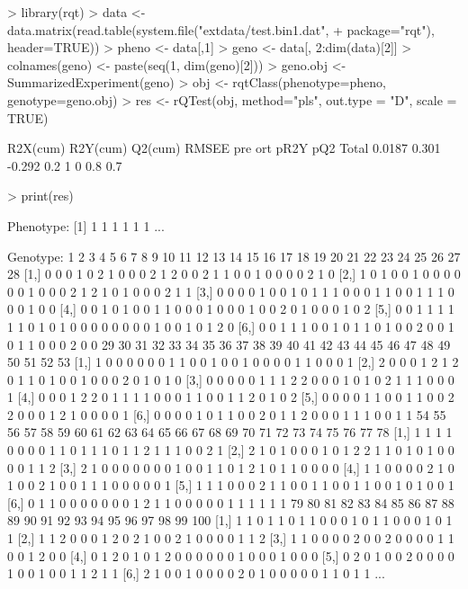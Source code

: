 \documentclass{article}
\begin{document}
\begin{Schunk}
\begin{Sinput}
> library(rqt)
> data <- data.matrix(read.table(system.file("extdata/test.bin1.dat",
+                                            package="rqt"), header=TRUE))
> pheno <- data[,1]
> geno <- data[, 2:dim(data)[2]]
> colnames(geno) <- paste(seq(1, dim(geno)[2]))
> geno.obj <- SummarizedExperiment(geno)
> obj <- rqtClass(phenotype=pheno, genotype=geno.obj)
> res <- rQTest(obj, method="pls", out.type = "D", scale = TRUE)
\end{Sinput}
\begin{Soutput}
      R2X(cum) R2Y(cum) Q2(cum) RMSEE pre ort pR2Y pQ2
Total   0.0187    0.301  -0.292   0.2   1   0  0.8 0.7
\end{Soutput}
\begin{Sinput}
> print(res)
\end{Sinput}
\begin{Soutput}
Phenotype:
[1] 1 1 1 1 1 1
...

Genotype:
     1 2 3 4 5 6 7 8 9 10 11 12 13 14 15 16 17 18 19 20 21 22 23 24 25 26 27 28
[1,] 0 0 0 1 0 2 1 0 0  0  2  1  2  0  0  2  1  1  0  0  1  0  0  0  0  2  1  0
[2,] 1 0 1 0 0 1 0 0 0  0  0  0  1  0  0  0  2  1  2  1  0  1  0  0  0  2  1  1
[3,] 0 0 0 0 1 0 0 1 0  1  1  1  0  0  0  1  1  0  0  1  1  1  0  0  0  1  0  0
[4,] 0 0 1 0 1 0 0 1 1  0  0  0  1  0  0  0  1  0  0  2  0  1  0  0  0  1  0  2
[5,] 0 0 1 1 1 1 1 1 0  1  0  1  0  0  0  0  0  0  0  0  1  0  0  1  0  1  2  0
[6,] 0 0 1 1 1 0 0 1 0  1  1  0  1  0  0  2  0  0  1  0  1  1  0  0  0  2  0  0
     29 30 31 32 33 34 35 36 37 38 39 40 41 42 43 44 45 46 47 48 49 50 51 52 53
[1,]  1  0  0  0  0  0  0  1  1  0  0  1  0  0  1  0  0  0  0  1  1  0  0  0  1
[2,]  2  0  0  0  1  2  1  2  0  1  1  0  1  0  0  1  0  0  0  2  0  1  0  1  0
[3,]  0  0  0  0  0  1  1  1  2  2  0  0  0  1  0  1  0  2  1  1  1  0  0  0  1
[4,]  0  0  0  1  2  2  0  1  1  1  1  0  0  0  1  1  0  0  1  1  2  0  1  0  2
[5,]  0  0  0  0  1  1  0  0  1  1  0  0  2  2  0  0  0  1  2  1  0  0  0  0  1
[6,]  0  0  0  0  1  0  1  1  0  0  2  0  1  1  2  0  0  0  1  1  1  0  0  1  1
     54 55 56 57 58 59 60 61 62 63 64 65 66 67 68 69 70 71 72 73 74 75 76 77 78
[1,]  1  1  1  1  0  0  0  0  1  1  0  1  1  1  0  1  1  2  1  1  1  0  0  2  1
[2,]  2  1  0  1  0  0  0  1  0  1  2  2  1  1  0  1  0  1  0  0  0  0  1  1  2
[3,]  2  1  0  0  0  0  0  0  0  1  0  0  1  1  0  1  2  1  0  1  1  0  0  0  0
[4,]  1  1  0  0  0  0  2  1  0  1  0  0  2  1  0  0  1  1  1  0  0  0  0  0  1
[5,]  1  1  1  0  0  0  2  1  1  0  0  1  1  0  0  1  1  0  0  1  0  1  0  0  1
[6,]  0  1  1  0  0  0  0  0  0  0  1  2  1  1  0  0  0  0  0  1  1  1  1  1  1
     79 80 81 82 83 84 85 86 87 88 89 90 91 92 93 94 95 96 97 98 99 100
[1,]  1  1  0  1  1  0  1  1  0  0  0  1  0  1  1  0  0  0  1  0  1   1
[2,]  1  1  2  0  0  0  1  2  0  2  1  0  0  2  1  0  0  0  0  1  1   2
[3,]  1  1  0  0  0  0  2  0  0  2  0  0  0  0  1  1  0  0  1  2  0   0
[4,]  0  1  2  0  1  0  1  2  0  0  0  0  0  0  1  0  0  0  1  0  0   0
[5,]  0  2  0  1  0  0  2  0  0  0  0  1  0  0  1  0  0  1  1  2  1   1
[6,]  2  1  0  0  1  0  0  0  0  2  0  1  0  0  0  0  0  1  1  0  1   1
...


\end{Soutput}
\end{Schunk}
\end{document}
